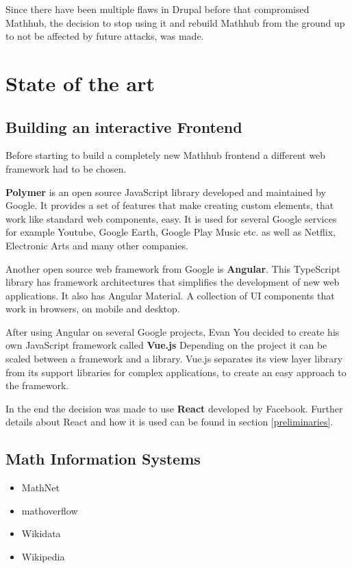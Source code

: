 \documentclass[11pt,a4paper]{article}
\begin{document}
Since there have been multiple flaws in Drupal before that compromised Mathhub, the decision to stop using it and rebuild Mathhub from the ground up to not be affected by future attacks, was made.

\section{State of the art}
\subsection{Building an interactive Frontend}
Before starting to build a completely new Mathhub frontend a different web framework had to be chosen.

\textbf{Polymer} is an open source JavaScript library developed and maintained by Google.
It provides a set of features that make creating custom elements, that work like standard web components, easy.
It is used for several Google services for example Youtube, Google Earth, Google Play Music etc. as well as Netflix, Electronic Arts and many other companies. \cite{polymer}

Another open source web framework from Google is \textbf{Angular}.
This TypeScript library has framework architectures that simplifies the development of new web applications.
It also has Angular Material.
A collection of UI components that work in browsers, on mobile and desktop. \cite{angular}

After using Angular on several Google projects, Evan You decided to create his own JavaScript framework called \textbf{Vue.js} \cite{vuewiki}
Depending on the project it can be scaled between a framework and a library.
Vue.js separates its view layer library from its support libraries for complex applications, to create an easy approach to the framework. \cite{vuegit}

In the end the decision was made to use \textbf{React} developed by Facebook.
Further details about React and how it is used can be found in section \ref{preliminaries}.

\subsection{Math Information Systems}
\begin{itemize}
\item MathNet
\item mathoverflow
\item Wikidata
\item Wikipedia
\end{itemize}
\end{document}
